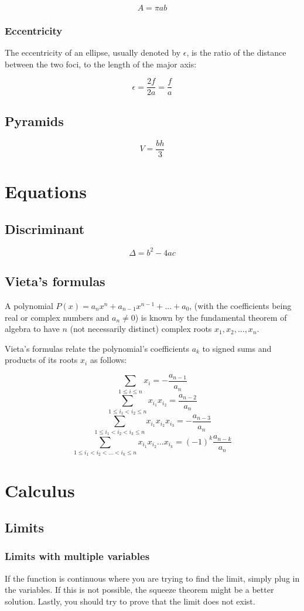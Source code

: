 \documentclass[12pt, oneside]{book}
\begin{document}
\[A = \pi a b\]

\subsection{Eccentricity}
The eccentricity of an ellipse, usually denoted by \(\epsilon\), is the ratio of
the distance between the two foci, to the length of the major axis:

\[\epsilon = \frac{2f}{2a} = \frac{f}{a}\]

\section{Pyramids}
\[V = \frac{bh}{3}\]

\chapter{Equations}
\section{Discriminant}
\[\Delta = b^2 - 4ac\]

\section{Vieta's formulas}
A polynomial \(P(x) = a_n x^n + a_{n-1} x^{n-1} + ... + a_0\), (with the
coefficients being real or complex numbers and \(a_n \neq 0\)) is known by the
fundamental theorem of algebra to have \(n\) (not necessarily distinct) complex
roots \(x_1, x_2, ..., x_n\).

Vieta's formulas relate the polynomial's coefficients \(a_k\) to signed sums
and products of its roots \(x_i\) as follows:

\[\sum_{1 \le i \le n} x_i = - \frac{a_{n-1}}{a_n}\]
\[\sum_{1 \le i_1 < i_2 \le n} x_{i_1} x_{i_2} = \frac{a_{n-2}}{a_n}\]
\[\sum_{1 \le i_1 < i_2 < i_3 \le n} x_{i_1} x_{i_2} x_{i_3} = -
\frac{a_{n-3}}{a_n}\]
\[\sum_{1 \le i_1 < i_2 < ... < i_k \le n} x_{i_1} x_{i_2} ... x_{i_k} = (-1)^k
\frac{a_{n-k}}{a_n}\]

\chapter{Calculus}
\section{Limits}
\subsection{Limits with multiple variables}
If the function is continuous where you are trying to find the limit, simply
plug in the variables. If this is not possible, the squeeze theorem might be a
better solution. Lastly, you should try to prove that the limit does not exist.
\end{document}
